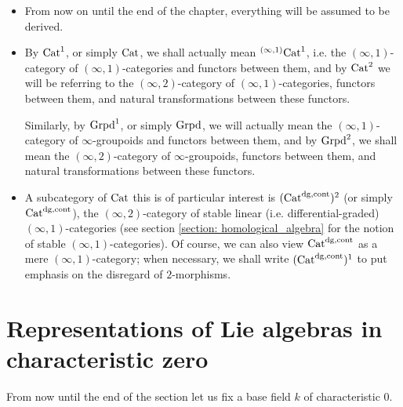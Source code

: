     \begin{convention} \label{conv: formal_geometry_everything_is_derived}
        \noindent
        \begin{itemize}
            \item From now on until the end of the chapter, everything will be assumed to be derived. 
            \item By $\mathrm{Cat}^1$, or simply $\mathrm{Cat}$, we shall actually mean ${}^{(\infty, 1)}\mathrm{Cat}^1$, i.e. the $(\infty, 1)$-category of $(\infty, 1)$-categories and functors between them, and by $\mathrm{Cat}^2$ we will be referring to the $(\infty, 2)$-category of $(\infty, 1)$-categories, functors between them, and natural transformations between these functors. 
            
            Similarly, by $\mathrm{Grpd}^1$, or simply $\mathrm{Grpd}$, we will actually mean the $(\infty, 1)$-category of $\infty$-groupoids and functors between them, and by $\mathrm{Grpd}^2$, we shall mean the $(\infty, 2)$-category of $\infty$-groupoids, functors between them, and natural transformations between these functors.
            \item A subcategory of $\mathrm{Cat}$ this is of particular interest is $(\mathrm{Cat}^{\mathrm{dg}, \mathrm{cont}})^2$ (or simply $\mathrm{Cat}^{\mathrm{dg}, \mathrm{cont}}$), the $(\infty, 2)$-category of stable linear (i.e. differential-graded) $(\infty, 1)$-categories (see section \ref{section: homological_algebra} for the notion of stable $(\infty, 1)$-categories). Of course, we can also view $\mathrm{Cat}^{\mathrm{dg}, \mathrm{cont}}$ as a mere $(\infty, 1)$-category; when necessary, we shall write $(\mathrm{Cat}^{\mathrm{dg}, \mathrm{cont}})^1$ to put emphasis on the disregard of $2$-morphisms.
        \end{itemize} 
    \end{convention}
    
    \section{Representations of Lie algebras in characteristic zero}
        \begin{convention}
            From now until the end of the section let us fix a base field $k$ of characteristic $0$.
        \end{convention}
    
